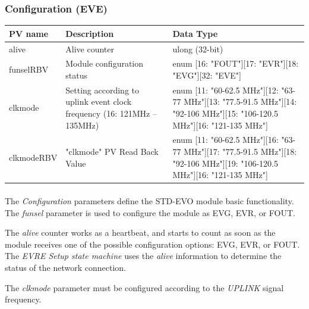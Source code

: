 \documentclass[openany]{article}
\begin{document}
		\subsubsection{Configuration (EVE)}\label{pvgroup:eve-configuration}
			\begin{center}
			\begin{tabular}{| m{2.8cm} m{6cm} m{6cm} |}
			    \hline
			    \bfseries PV name & \bfseries Description & \bfseries Data Type \\ \hline
			    alive & Alive counter & ulong (32-bit) \\ \hline
			    funselRBV & Module configuration status & enum [16: "FOUT"][17: "EVR"][18: "EVG"][32: "EVE"] \\ \hline
			    clkmode & Setting according to uplink event clock frequency (16: 121MHz – 135MHz) & enum [11: "60-62.5 MHz"][12: "63-77 MHz"][13: "77.5-91.5 MHz"][14: "92-106 MHz"][15: "106-120.5 MHz"][16: "121-135 MHz"] \\ \hline
			    clkmodeRBV & "clkmode" PV Read Back Value & enum [11: "60-62.5 MHz"][16: "63-77 MHz"][17: "77.5-91.5 MHz"][18: "92-106 MHz"][19: "106-120.5 MHz"][16: "121-135 MHz"] \\ \hline
			\end{tabular}
			\end{center}

			\paragraph{} The \emph{Configuration} parameters define the STD-EVO module basic functionality. The \emph{funsel} parameter is used to configure the module as EVG, EVR, or FOUT. 
			\par The \emph{alive} counter works as a heartbeat, and starts to count as soon as the module receives one of the possible configuration options: EVG, EVR, or FOUT. The \emph{EVRE Setup state machine} uses the \emph{alive} information to determine the status of the network connection.
			\par The \emph{clkmode} parameter must be configured according to the \emph{UPLINK} signal frequency.
\end{document}
